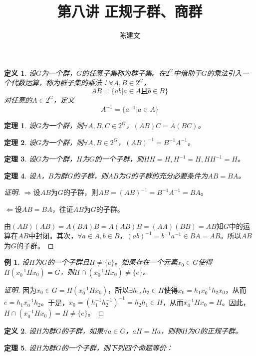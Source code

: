 \documentclass{article}
\newtheorem{Def}{定义}
\newtheorem{Thm}{定理}
\newtheorem*{Example}{例}
\begin{document}
\begin{CJK*}{UTF8}{gbsn}
  \title{第八讲 正规子群、商群}
  \author{陈建文}
  \maketitle
  \begin{Def}
    设$G$为一个群，$G$的任意子集称为群子集。在$2^G$中借助于$G$的乘法引入一个代数运算，称为群子集的乘法：$\forall A,B\in 2^G$，
    \[AB=\{ab|a\in A \text{且} b\in B\}\]
    对任意的$A\in 2^G$，定义
  \[A^{-1}=\{a^{-1}|a\in A\}\]
  \end{Def}
  
  \begin{Thm}
    设$G$为一个群，则$\forall A,B,C\in 2^G$，$(AB)C=A(BC)$。
  \end{Thm}
  
  \begin{Thm}
    设$G$为一个群，则$\forall A,B\in 2^G$，$(AB)^{-1}=B^{-1}A^{-1}$。
  \end{Thm}
  
  \begin{Thm}
    设$G$为一个群，$H$为$G$的一个子群，则$HH=H,H^{-1}=H,HH^{-1}=H$。
  \end{Thm}
  
  \begin{Thm}
  设$A$，$B$为群$G$的子群，则$AB$为$G$的子群的充分必要条件为$AB=BA$。
  \end{Thm}
  \begin{proof}[证明]
    $\Rightarrow$设$AB$为$G$的子群，则$AB=(AB)^{-1}=B^{-1}A^{-1}=BA$。
  
  $\Leftarrow$设$AB=BA$，往证$AB$为$G$的子群。
  
  由$(AB)(AB)=A(BA)B=A(AB)B=(AA)(BB)=AB$知$G$中的运算在$AB$中封闭。其次，$\forall a\in A, b\in B$，$(ab)^{-1}=b^{-1}a^{-1}\in BA=AB$。所以$AB$为$G$的子群。
  \end{proof}
  \begin{Example}
  设$H$为$G$的一个子群且$H\neq \{e\}$。如果存在一个元素$x_0\in G$使得$H(x_0^{-1}Hx_0)=G$，则$H\cap (x_0^{-1}Hx_0)\neq \{e\}$。
  \end{Example}
  \begin{proof}[证明]
    因为$x_0\in G=H(x_0^{-1}Hx_0)$，所以$\exists h_1,h_2\in H$使得$x_0=h_1x_0^{-1}h_2x_0$，从而$e=h_1x_0^{-1}h_2$。于是，$x_0=(h_1^{-1}h_2^{-1})^{-1}=h_2h_1\in H$，从而$x_0^{-1}Hx_0=H$。因此，$H\cap (x_0^{-1}Hx_0)=H\neq \{e\}$。
  \end{proof}
  \begin{Def}
    设$H$为群$G$的子群，如果$\forall a\in G$，$aH=Ha$，则称$H$为$G$的正规子群。
  \end{Def}
  \begin{Thm}
   设$H$为群$G$的一个子群，则下列四个命题等价：
  

\end{Thm}
\end{CJK*}
\end{document}
